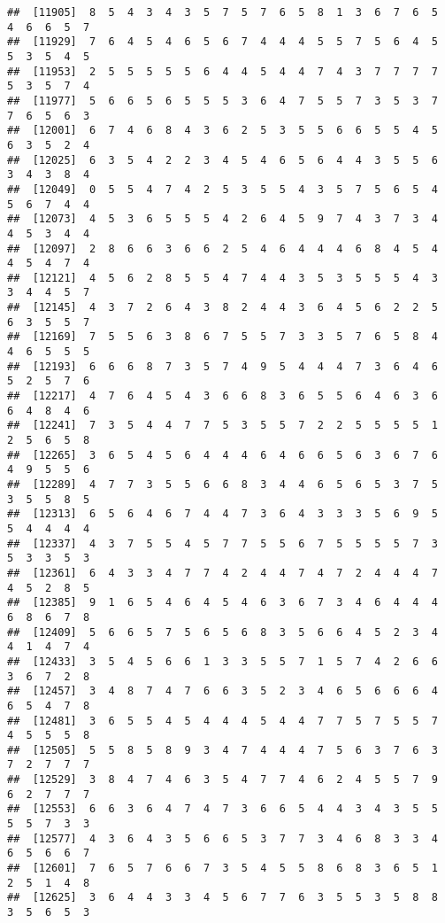 \documentclass[
]{book}
\begin{document}
\begin{verbatim}
##  [11905]  8  5  4  3  4  3  5  7  5  7  6  5  8  1  3  6  7  6  5  4  6  6  5  7
##  [11929]  7  6  4  5  4  6  5  6  7  4  4  4  5  5  7  5  6  4  5  5  3  5  4  5
##  [11953]  2  5  5  5  5  5  6  4  4  5  4  4  7  4  3  7  7  7  7  5  3  5  7  4
##  [11977]  5  6  6  5  6  5  5  5  3  6  4  7  5  5  7  3  5  3  7  7  6  5  6  3
##  [12001]  6  7  4  6  8  4  3  6  2  5  3  5  5  6  6  5  5  4  5  6  3  5  2  4
##  [12025]  6  3  5  4  2  2  3  4  5  4  6  5  6  4  4  3  5  5  6  3  4  3  8  4
##  [12049]  0  5  5  4  7  4  2  5  3  5  5  4  3  5  7  5  6  5  4  5  6  7  4  4
##  [12073]  4  5  3  6  5  5  5  4  2  6  4  5  9  7  4  3  7  3  4  4  5  3  4  4
##  [12097]  2  8  6  6  3  6  6  2  5  4  6  4  4  4  6  8  4  5  4  4  5  4  7  4
##  [12121]  4  5  6  2  8  5  5  4  7  4  4  3  5  3  5  5  5  4  3  3  4  4  5  7
##  [12145]  4  3  7  2  6  4  3  8  2  4  4  3  6  4  5  6  2  2  5  6  3  5  5  7
##  [12169]  7  5  5  6  3  8  6  7  5  5  7  3  3  5  7  6  5  8  4  4  6  5  5  5
##  [12193]  6  6  6  8  7  3  5  7  4  9  5  4  4  4  7  3  6  4  6  5  2  5  7  6
##  [12217]  4  7  6  4  5  4  3  6  6  8  3  6  5  5  6  4  6  3  6  6  4  8  4  6
##  [12241]  7  3  5  4  4  7  7  5  3  5  5  7  2  2  5  5  5  5  1  2  5  6  5  8
##  [12265]  3  6  5  4  5  6  4  4  4  6  4  6  6  5  6  3  6  7  6  4  9  5  5  6
##  [12289]  4  7  7  3  5  5  6  6  8  3  4  4  6  5  6  5  3  7  5  3  5  5  8  5
##  [12313]  6  5  6  4  6  7  4  4  7  3  6  4  3  3  3  5  6  9  5  5  4  4  4  4
##  [12337]  4  3  7  5  5  4  5  7  7  5  5  6  7  5  5  5  5  7  3  5  3  3  5  3
##  [12361]  6  4  3  3  4  7  7  4  2  4  4  7  4  7  2  4  4  4  7  4  5  2  8  5
##  [12385]  9  1  6  5  4  6  4  5  4  6  3  6  7  3  4  6  4  4  4  6  8  6  7  8
##  [12409]  5  6  6  5  7  5  6  5  6  8  3  5  6  6  4  5  2  3  4  4  1  4  7  4
##  [12433]  3  5  4  5  6  6  1  3  3  5  5  7  1  5  7  4  2  6  6  3  6  7  2  8
##  [12457]  3  4  8  7  4  7  6  6  3  5  2  3  4  6  5  6  6  6  4  6  5  4  7  8
##  [12481]  3  6  5  5  4  5  4  4  4  5  4  4  7  7  5  7  5  5  7  4  5  5  5  8
##  [12505]  5  5  8  5  8  9  3  4  7  4  4  4  7  5  6  3  7  6  3  7  2  7  7  7
##  [12529]  3  8  4  7  4  6  3  5  4  7  7  4  6  2  4  5  5  7  9  6  2  7  7  7
##  [12553]  6  6  3  6  4  7  4  7  3  6  6  5  4  4  3  4  3  5  5  5  5  7  3  3
##  [12577]  4  3  6  4  3  5  6  6  5  3  7  7  3  4  6  8  3  3  4  6  5  6  6  7
##  [12601]  7  6  5  7  6  6  7  3  5  4  5  5  8  6  8  3  6  5  1  2  5  1  4  8
##  [12625]  3  6  4  4  3  3  4  5  6  7  7  6  3  5  5  3  5  8  8  3  5  6  5  3

\end{verbatim}
\end{document}
